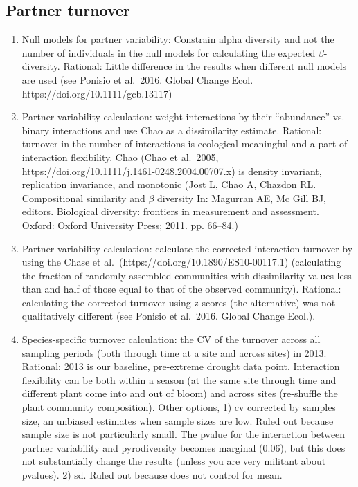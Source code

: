 \documentclass[12pt]{article}
\begin{document}
\subsection{Partner turnover}
\begin{enumerate}
\item Null models for partner variability: Constrain alpha diversity
  and not the number of individuals in the null models for calculating
  the expected $\beta$-diversity. Rational: Little difference in the
  results when different null models are used (see Ponisio et
  al.~2016. Global Change Ecol. https://doi.org/10.1111/gcb.13117)
\item Partner variability calculation: weight interactions by their
  ``abundance'' vs. binary interactions and use Chao as a
  dissimilarity estimate. Rational: turnover in the number of
  interactions is ecological meaningful and a part of interaction
  flexibility. Chao (Chao et al.~2005,
  https://doi.org/10.1111/j.1461-0248.2004.00707.x) is density
  invariant, replication invariance, and monotonic (Jost L, Chao A,
  Chazdon RL. Compositional similarity and $\beta$ diversity In:
  Magurran AE, Mc Gill BJ, editors. Biological diversity: frontiers in
  measurement and assessment. Oxford: Oxford University Press;
  2011. pp. 66–84.)
\item Partner variability calculation: calculate the corrected
  interaction turnover by using the Chase et al.\
  (https://doi.org/10.1890/ES10-00117.1) (calculating the fraction of
  randomly assembled communities with dissimilarity values less than
  and half of those equal to that of the observed
  community). Rational: calculating the corrected turnover using
  z-scores (the alternative) was not qualitatively different (see
  Ponisio et al.~2016. Global Change Ecol.).
\item Species-specific turnover calculation: the CV of the turnover
  across all sampling periods (both through time at a site and across
  sites) in 2013. Rational: 2013 is our baseline, pre-extreme drought
  data point. Interaction flexibility can be both within a season (at
  the same site through time and different plant come into and out of
  bloom) and across sites (re-shuffle the plant community
  composition). Other options, 1) cv corrected by samples size, an
  unbiased estimates when sample sizes are low. Ruled out because
  sample size is not particularly small. The pvalue
  for the interaction between partner variability and pyrodiversity
  becomes marginal (0.06), but this does not substantially change the
  results (unless you are very militant about pvalues). 2) sd. Ruled
  out because does not control for mean. 
\end{enumerate}
\end{document}
